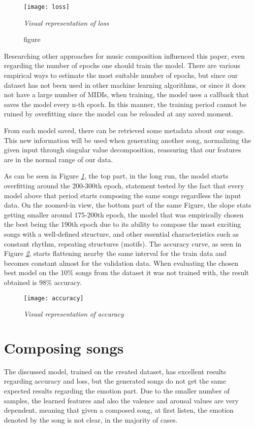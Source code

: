 \begin{figure}[h]
  \centering
  \texttt{[image: loss]}
  \caption{figure}{\emph{Visual representation of loss}}
  \label{fig:loss}
\end{figure}

Researching other approaches for music composition influenced this paper,
even regarding the number of epochs one should train the model.
There are various empirical ways to estimate the most suitable number of epochs,
but since our dataset has not been used in other machine learning algorithms,
or since it does not have a large number of MIDIs, when training,
the model uses a callback that saves the model every n-th epoch.
In this manner, the training period cannot be ruined by overfitting
since the model can be reloaded at any saved moment.


From each model saved,
there can be retrieved some metadata about our songs.
This new information will be used when generating another song,
normalizing the given input through singular value decomposition,
reassuring that our features are in the normal range of our data.


As can be seen in Figure \emph{\ref{fig:loss}}, the top part, in the long run,
the model starts overfitting around the 200-300th epoch,
statement tested by the fact that every model above that period starts
composing the same songs regardless the input data. On the zoomed-in view,
the bottom part of the same Figure, the slope stats getting smaller around 175-200th epoch,
the model that was empirically chosen the best being the 190th epoch
due to its ability to compose the most exciting songs with a well-defined structure,
and other essential characteristics such as constant rhythm,
repeating structures (motifs). The accuracy curve, as seen in Figure \emph{\ref{fig:accuracy}},
starts flattening nearby the same interval for the train data and becomes
constant almost for the validation data.
When evaluating the chosen best model on the 10\% songs from the dataset
it was not trained with, the result obtained is 98\% accuracy.


\begin{figure}[h]
  \centering
  \texttt{[image: accuracy]}
  \caption{\emph{Visual representation of accuracy}}
  \label{fig:accuracy}
\end{figure}



\section{Composing songs}
The discussed model, trained on the created dataset,
has excellent results regarding accuracy and loss,
but the generated songs do not get the same expected results regarding the emotion part.
Due to the smaller number of samples,
the learned features and also the valence and arousal values are very dependent,
meaning that given a composed song, at first listen,
the emotion denoted by the song is not clear, in the majority of cases.


